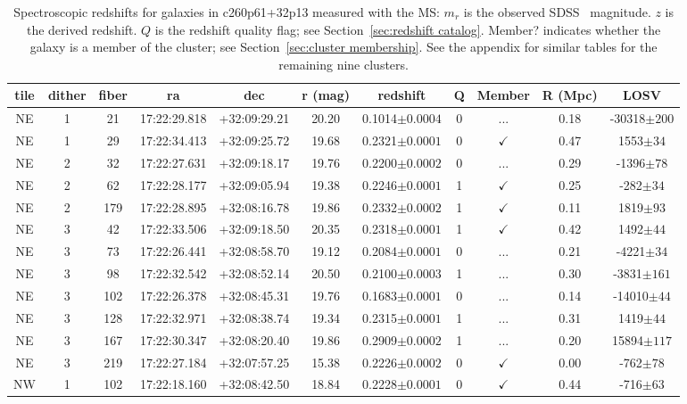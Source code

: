 \begin{table*}
	\centering \caption{Spectroscopic redshifts for galaxies in c260p61+32p13 measured with the MS: $m_r$ is the observed SDSS \sdssr\ magnitude. $z$ is the derived redshift. $Q$ is the redshift quality flag; see Section~\ref{sec:redshift catalog}. Member? indicates whether the galaxy is a member of the cluster; see Section~\ref{sec:cluster membership}. See the appendix for similar tables for the remaining nine clusters.}
	\begin{tabular}{ccccccccccc}
		\hline
		tile & dither & fiber & ra & dec & r (mag) & redshift & Q & Member & R (Mpc) & LOSV \\
		\hline \hline
NE & 1 & 21 & 17:22:29.818 & +32:09:29.21 & 20.20 & 0.1014$\pm{0.0004}$ & 0 & ... & 0.18 & -30318$\pm{200}$ \\
NE & 1 & 29 & 17:22:34.413 & +32:09:25.72 & 19.68 & 0.2321$\pm{0.0001}$ & 0 & $\checkmark$ & 0.47 & 1553$\pm{34}$ \\
NE & 2 & 32 & 17:22:27.631 & +32:09:18.17 & 19.76 & 0.2200$\pm{0.0002}$ & 0 & ... & 0.29 & -1396$\pm{78}$ \\
NE & 2 & 62 & 17:22:28.177 & +32:09:05.94 & 19.38 & 0.2246$\pm{0.0001}$ & 1 & $\checkmark$ & 0.25 & -282$\pm{34}$ \\
NE & 2 & 179 & 17:22:28.895 & +32:08:16.78 & 19.86 & 0.2332$\pm{0.0002}$ & 1 & $\checkmark$ & 0.11 & 1819$\pm{93}$ \\
NE & 3 & 42 & 17:22:33.506 & +32:09:18.50 & 20.35 & 0.2318$\pm{0.0001}$ & 1 & $\checkmark$ & 0.42 & 1492$\pm{44}$ \\
NE & 3 & 73 & 17:22:26.441 & +32:08:58.70 & 19.12 & 0.2084$\pm{0.0001}$ & 0 & ... & 0.21 & -4221$\pm{34}$ \\
NE & 3 & 98 & 17:22:32.542 & +32:08:52.14 & 20.50 & 0.2100$\pm{0.0003}$ & 1 & ... & 0.30 & -3831$\pm{161}$ \\
NE & 3 & 102 & 17:22:26.378 & +32:08:45.31 & 19.76 & 0.1683$\pm{0.0001}$ & 0 & ... & 0.14 & -14010$\pm{44}$ \\
NE & 3 & 128 & 17:22:32.971 & +32:08:38.74 & 19.34 & 0.2315$\pm{0.0001}$ & 1 & ... & 0.31 & 1419$\pm{44}$ \\
NE & 3 & 167 & 17:22:30.347 & +32:08:20.40 & 19.86 & 0.2909$\pm{0.0002}$ & 1 & ... & 0.20 & 15894$\pm{117}$ \\
NE & 3 & 219 & 17:22:27.184 & +32:07:57.25 & 15.38 & 0.2226$\pm{0.0002}$ & 0 & $\checkmark$ & 0.00 & -762$\pm{78}$ \\
NW & 1 & 102 & 17:22:18.160 & +32:08:42.50 & 18.84 & 0.2228$\pm{0.0001}$ & 0 & $\checkmark$ & 0.44 & -716$\pm{63}$ \\

\end{tabular}
\end{table*}
